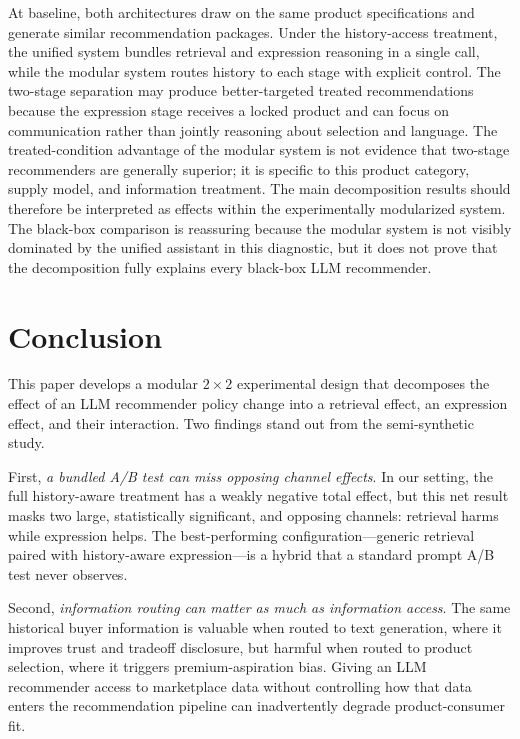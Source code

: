 \documentclass[11pt]{article}
\begin{document}
At baseline, both architectures draw on the same product specifications and generate similar recommendation packages. Under the history-access treatment, the unified system bundles retrieval and expression reasoning in a single call, while the modular system routes history to each stage with explicit control. The two-stage separation may produce better-targeted treated recommendations because the expression stage receives a locked product and can focus on communication rather than jointly reasoning about selection and language. The treated-condition advantage of the modular system is not evidence that two-stage recommenders are generally superior; it is specific to this product category, supply model, and information treatment. The main decomposition results should therefore be interpreted as effects within the experimentally modularized system. The black-box comparison is reassuring because the modular system is not visibly dominated by the unified assistant in this diagnostic, but it does not prove that the decomposition fully explains every black-box LLM recommender.

\section{Conclusion}\label{section:conclusion}

This paper develops a modular $2 \times 2$ experimental design that decomposes the effect of an LLM recommender policy change into a retrieval effect, an expression effect, and their interaction. Two findings stand out from the semi-synthetic study.

First, \emph{a bundled A/B test can miss opposing channel effects}. In our setting, the full history-aware treatment has a weakly negative total effect, but this net result masks two large, statistically significant, and opposing channels: retrieval harms while expression helps. The best-performing configuration---generic retrieval paired with history-aware expression---is a hybrid that a standard prompt A/B test never observes.

Second, \emph{information routing can matter as much as information access}. The same historical buyer information is valuable when routed to text generation, where it improves trust and tradeoff disclosure, but harmful when routed to product selection, where it triggers premium-aspiration bias. Giving an LLM recommender access to marketplace data without controlling how that data enters the recommendation pipeline can inadvertently degrade product-consumer fit.
\end{document}
